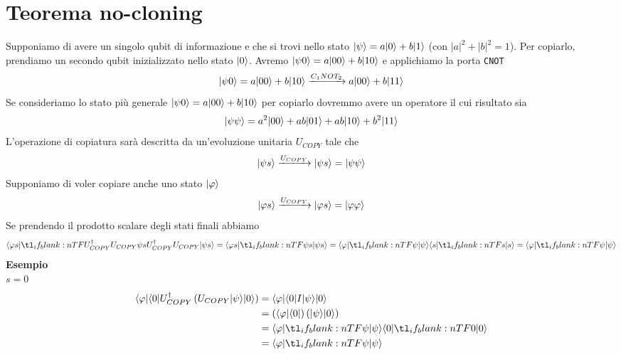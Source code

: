\documentclass[12pt, a4paper]{report}
\begin{document}
\section{Teorema no-cloning}
Supponiamo di avere un singolo qubit di informazione e che si trovi nello stato $| \psi \rangle=a| 0 \rangle+b| 1 \rangle$ (con $|a|^{2}+|b|^{2}=1$). Per copiarlo, prendiamo un secondo qubit inizializzato nello stato $| 0 \rangle$. Avremo $| \psi0 \rangle=a| 00 \rangle+b| 10 \rangle$ e applichiamo la porta \texttt{CNOT}
\begin{equation*}
    | \psi0 \rangle=a| 00 \rangle+b| 10 \rangle\xrightarrow{C_{1}NOT_{2}} a| 00 \rangle+b| 11 \rangle
\end{equation*}
Se consideriamo lo stato più generale $| \psi0 \rangle=a| 00 \rangle+b| 10 \rangle$ per copiarlo dovremmo avere un operatore il cui risultato sia
\begin{equation*}
    | \psi\psi \rangle = a^{2}| 00 \rangle+ab| 01 \rangle+ab| 10 \rangle+b^{2}| 11 \rangle
\end{equation*}
L'operazione di copiatura sarà descritta da un'evoluzione unitaria $U_{COPY}$ tale che
\begin{equation*}
    | \psi s \rangle\xrightarrow{U_{COPY}}| \psi s \rangle=| \psi\psi \rangle
\end{equation*}
Supponiamo di voler copiare anche uno stato $| \varphi \rangle$ 
\begin{equation*}
    | \varphi s \rangle\xrightarrow{U_{COPY}}| \varphi s \rangle=| \varphi\varphi \rangle
\end{equation*}
Se prendendo il prodotto scalare degli stati finali abbiamo
\begin{equation*}
    \braket{\varphi s}[U^{\dagger}_{COPY}U_{COPY}]{\psi s} = \braket{\varphi s}{\psi s} = \braket{\varphi}{\psi}\braket{s}{s} = \braket{\varphi}{\psi}
\end{equation*}
\textbf{Esempio}\\
$s = 0$
\begin{equation*}
    \begin{split}
      \bra{\varphi}\bra{0}U^{\dagger}_{COPY}\left(U_{COPY}\ket{\psi}\ket{0}\right) &= \bra{\varphi}\bra{0}I\ket{\psi}\ket{0} \\
      &= \left(\bra{\varphi}\bra{0}\right)\left(\ket{\psi}\ket{0}\right) \\
      &= \braket{\varphi}{\psi}\braket{0}{0} \\
      &= \braket{\varphi}{\psi}
    \end{split}
\end{equation*}
\end{document}
